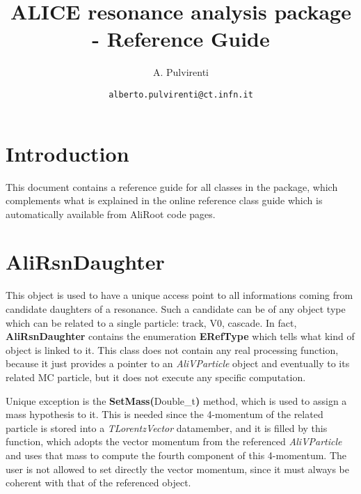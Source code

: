 \documentclass[12pt,a4paper]{article}
\title{ALICE resonance analysis package - Reference Guide}
\author{A. Pulvirenti}
\date{\tt alberto.pulvirenti@ct.infn.it}
\newcommand{\inlinecode}[2]{\mbox{{\bf #1(}#2{\bf)}}}
\newcommand{\classb}[1]{\mbox{{\bf #1}}}
\newcommand{\classi}[1]{\mbox{{\em #1}}}
\begin{document}
\lstset{language=C++}
\lstset{basicstyle=\tiny}

\maketitle

\section{Introduction}

This document contains a reference guide for all classes in the package, which complements what is explained
in the online reference class guide which is automatically available from AliRoot code pages.

\section{AliRsnDaughter}

This object is used to have a unique access point to all informations coming from candidate daughters of a resonance.
Such a candidate can be of any object type which can be related to a single particle: track, V0, cascade.
In fact, \classb{AliRsnDaughter} contains the enumeration \classb{ERefType} which tells what kind of object is linked to it.
This class does not contain any real processing function, because it just provides a pointer to an \classi{AliVParticle} object
and eventually to its related MC particle, but it does not execute any specific computation.

Unique exception is the \inlinecode{SetMass}{Double_t} method, which is used to assign a mass hypothesis to it.
This is needed since the 4-momentum of the related particle is stored into a \classi{TLorentzVector} datamember, and it
is filled by this function, which adopts the vector momentum from the referenced \classi{AliVParticle} and uses that mass
to compute the fourth component of this 4-momentum. 
The user is not allowed to set directly the vector momentum, since it must always be coherent with that of the referenced object.
\end{document}
